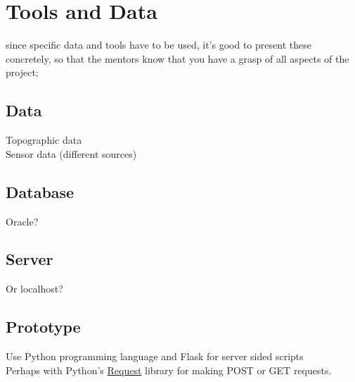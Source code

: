 \chapter{Tools and Data}
\label{chap:TD}

since specific data and tools have to be used, it’s good to present these concretely, so that the mentors know that you have a grasp of all aspects of the project;


\section{Data}
Topographic data\\
Sensor data (different sources)

\section{Database}
Oracle?

\section{Server}
Or localhost?

\section{Prototype}
Use Python programming language and Flask for server sided scripts\\
Perhaps with Python's \href{http://docs.python-requests.org/en/latest/user/quickstart/}{Request} library for making POST or GET requests.  
